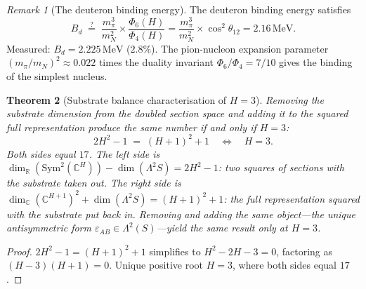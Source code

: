 \documentclass[11pt,a4paper]{article}
\newtheorem{theorem}{Theorem}[section]
\theoremstyle{definition}
\theoremstyle{remark}
\newtheorem{remark}[theorem]{Remark}
\newcommand{\C}{\mathbb{C}}
\newcommand{\R}{\mathbb{R}}
\newcommand{\Sym}{\mathrm{Sym}}
\begin{document}
\begin{remark}[The deuteron binding energy]\label{rem:deuteron}
The deuteron binding energy satisfies
\begin{equation}\label{eq:deuteron}
B_d\;\stackrel{?}{=}\;\frac{m_\pi^3}{m_N^2}\times\frac{\Phi_6(H)}{\Phi_4(H)}=\frac{m_\pi^3}{m_N^2}\times\cos^2\theta_{12}=2.16\,\mathrm{MeV}.
\end{equation}
Measured: $B_d=2.225\,\mathrm{MeV}$ ($2.8\%$). The pion-nucleon expansion parameter $(m_\pi/m_N)^2\approx 0.022$ times the duality invariant $\Phi_6/\Phi_4=7/10$ gives the binding of the simplest nucleus.
\end{remark}

\begin{theorem}[Substrate balance characterisation of $H=3$]\label{thm:substrate_balance}
Removing the substrate dimension from the doubled section space and adding it to the squared full representation produce the same number if and only if $H=3$:
\begin{equation}\label{eq:substrate_balance}
2H^2-1 \;=\; (H+1)^2+1 \quad\Longleftrightarrow\quad H=3.
\end{equation}
Both sides equal $17$. The left side is $\dim_\R(\Sym^2(\C^H))-\dim(\Lambda^2 S)=2H^2-1$: two squares of sections with the substrate taken out. The right side is $\dim_\C(\C^{H+1})^2+\dim(\Lambda^2 S)=(H+1)^2+1$: the full representation squared with the substrate put back in. Removing and adding the same object---the unique antisymmetric form $\varepsilon_{AB}\in\Lambda^2(S)$---yield the same result only at $H=3$.
\end{theorem}

\begin{proof}
$2H^2-1=(H+1)^2+1$ simplifies to $H^2-2H-3=0$, factoring as $(H-3)(H+1)=0$. Unique positive root $H=3$, where both sides equal $17$.
\end{proof}
\end{document}
